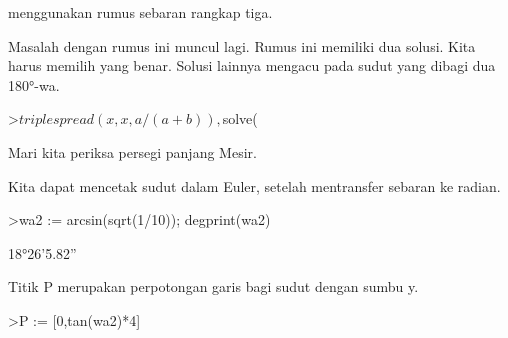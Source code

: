 \documentclass[a4paper,10pt]{article}
\begin{document}
\begin{eulernotebook}
\begin{eulercomment}
\begin{eulercomment}
\begin{eulercomment}
\begin{eulercomment}
\begin{eulercomment}
\begin{eulercomment}
\begin{eulercomment}
\begin{eulercomment}
\begin{eulercomment}
\begin{eulercomment}
\begin{eulercomment}
\begin{eulercomment}
\begin{eulercomment}
\begin{eulercomment}
\begin{eulercomment}
\begin{eulercomment}
\begin{eulercomment}
\begin{eulercomment}
\begin{eulercomment}
\begin{eulercomment}
\begin{eulercomment}
\begin{eulercomment}
\begin{eulercomment}
\begin{eulercomment}
\begin{eulercomment}
\begin{eulercomment}
\begin{eulercomment}
\begin{eulercomment}
\begin{eulercomment}
\begin{eulercomment}
\begin{eulercomment}
\begin{eulercomment}
\begin{eulercomment}
\begin{eulercomment}
\begin{eulercomment}
\begin{eulercomment}
\begin{eulercomment}
\begin{eulercomment}
\begin{eulercomment}
\begin{eulercomment}
\begin{eulercomment}
menggunakan rumus sebaran rangkap tiga.

Masalah dengan rumus ini muncul lagi. Rumus ini memiliki dua solusi.
Kita harus memilih yang benar. Solusi lainnya mengacu pada sudut yang
dibagi dua 180°-wa.
\end{eulercomment}
\begin{eulerprompt}
>$triplespread(x,x,a/(a+b)), $solve(%
\end{eulerprompt}
\begin{eulercomment}
Mari kita periksa persegi panjang Mesir.
\end{eulercomment}
\begin{eulercomment}
Kita dapat mencetak sudut dalam Euler, setelah mentransfer sebaran ke
radian. 
\end{eulercomment}
\begin{eulerprompt}
>wa2 := arcsin(sqrt(1/10)); degprint(wa2)
\end{eulerprompt}
\begin{euleroutput}
  18°26'5.82''
\end{euleroutput}
\begin{eulercomment}
Titik P merupakan perpotongan garis bagi sudut dengan sumbu y.
\end{eulercomment}
\begin{eulerprompt}
>P := [0,tan(wa2)*4]
\end{eulerprompt}
\begin{euleroutput}
  [0,  1.33333]
\end{euleroutput}

\end{eulercomment}
\end{eulercomment}
\end{eulercomment}
\end{eulercomment}
\end{eulercomment}
\end{eulercomment}
\end{eulercomment}
\end{eulercomment}
\end{eulercomment}
\end{eulercomment}
\end{eulercomment}
\end{eulercomment}
\end{eulercomment}
\end{eulercomment}
\end{eulercomment}
\end{eulercomment}
\end{eulercomment}
\end{eulercomment}
\end{eulercomment}
\end{eulercomment}
\end{eulercomment}
\end{eulercomment}
\end{eulercomment}
\end{eulercomment}
\end{eulercomment}
\end{eulercomment}
\end{eulercomment}
\end{eulercomment}
\end{eulercomment}
\end{eulercomment}
\end{eulercomment}
\end{eulercomment}
\end{eulercomment}
\end{eulercomment}
\end{eulercomment}
\end{eulercomment}
\end{eulercomment}
\end{eulercomment}
\end{eulercomment}
\end{eulercomment}
\end{eulernotebook}
\end{document}
